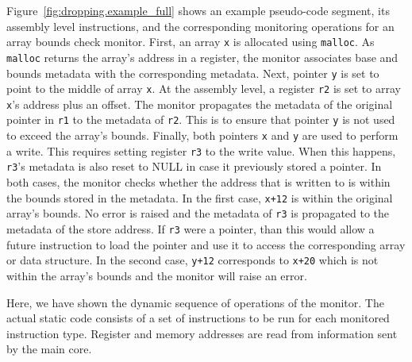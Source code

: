 Figure~\ref{fig:dropping.example_full} shows an example pseudo-code segment,
its assembly level instructions, and the corresponding monitoring operations
for an array bounds check monitor. 
First, an array {\tt x} is allocated using {\tt malloc}. 
As {\tt malloc} returns the array's address in a register, the monitor
associates base and bounds metadata with the corresponding metadata. 
Next, pointer {\tt y} is set to point to the middle of array {\tt x}. 
At the assembly level, a register {\tt r2} is set to array {\tt x}'s address plus an offset.
The monitor propagates the metadata of the original pointer in {\tt r1} to the
metadata of {\tt r2}. This is to ensure that pointer {\tt y} is not used to exceed the array's bounds.
Finally, both pointers {\tt x} and {\tt y} are used to perform a write. 
This requires setting register {\tt r3} to the write value. When this happens,
{\tt r3}'s metadata is also reset to NULL in case it previously stored a
pointer. In both cases, the monitor checks whether the address that is written
to is within the bounds stored in the metadata. In the first case, {\tt x+12}
is within the original array's bounds. No error is raised and the metadata of
{\tt r3} is propagated to the metadata of the store address. If {\tt r3} were a
pointer, than this would allow a future instruction to load the pointer and use
it to access the corresponding array or data structure. In the second case,
{\tt y+12} corresponds to {\tt x+20} which is not within the array's bounds and
the monitor will raise an error. 

Here, we have shown the dynamic sequence of operations of the monitor.
The actual static code consists of a set of instructions to be run for each
monitored instruction type. Register and memory addresses are read from
information sent by the main core.

